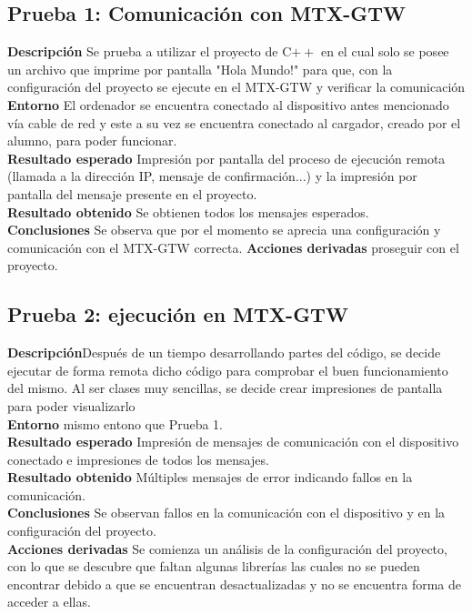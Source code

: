 \subsection{Prueba 1: Comunicación con MTX-GTW}
\textbf{Descripción} Se prueba a utilizar el proyecto de C$++$ en el cual solo se posee un archivo que imprime por pantalla "Hola Mundo!" para que, con la configuración del proyecto se ejecute en el MTX-GTW y verificar la comunicación\\
\textbf{Entorno} El ordenador se encuentra conectado al dispositivo antes mencionado vía cable de red y este a su vez se encuentra conectado al cargador, creado por el alumno, para poder funcionar.\\
\textbf{Resultado esperado} Impresión por pantalla del proceso de ejecución remota (llamada a la dirección IP, mensaje de confirmación...) y la impresión por pantalla del mensaje presente en el proyecto.\\
\textbf{Resultado obtenido} Se obtienen todos los mensajes esperados.\\
\textbf{Conclusiones} Se observa que por el momento se aprecia una configuración y comunicación con el MTX-GTW correcta.
\textbf{Acciones derivadas}  proseguir con el proyecto.\\
\subsection{Prueba 2: ejecución en MTX-GTW}
\textbf{Descripción}Después de un tiempo desarrollando partes del código, se decide ejecutar de forma remota dicho código para comprobar el buen funcionamiento del mismo. Al ser clases muy sencillas, se decide crear impresiones de pantalla para poder visualizarlo \\
\textbf{Entorno} mismo entono que Prueba 1.\\
\textbf{Resultado esperado} Impresión de mensajes de comunicación con el dispositivo conectado e impresiones de todos los mensajes.\\
\textbf{Resultado obtenido} Múltiples mensajes de error indicando fallos en la comunicación.\\
\textbf{Conclusiones} Se observan fallos en la comunicación con el dispositivo y en la configuración del proyecto.\\
\textbf{Acciones derivadas}  Se comienza un análisis de la configuración del proyecto, con lo que se descubre que faltan algunas librerías las cuales no se pueden encontrar debido a que se encuentran desactualizadas y no se encuentra forma de acceder a ellas.\\

